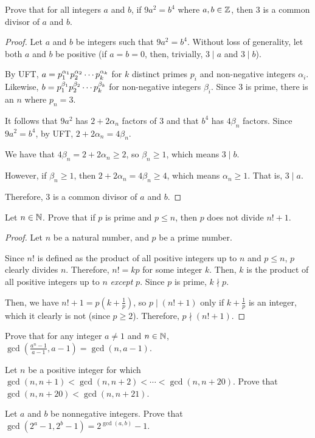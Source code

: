 \documentclass{agony}
\begin{document}
\question Prove that for all integers $a$ and $b$,
if $9a^2 = b^4$ where $a,b\in\mathbb{Z}$, then 3 is a common divisor of $a$ and $b$.
\begin{proof}
  Let $a$ and $b$ be integers such that $9a^2=b^4$.
  Without loss of generality, let both $a$ and $b$ be positive
  (if $a=b=0$, then, trivially, $3 \mid a$ and $3 \mid b$).

  By UFT, $a=\pf{\alpha_#1}{k}$ for $k$ distinct primes $p_i$ and non-negative integers $\alpha_i$.
  Likewise, $b=\pf{\beta_#1}{k}$ for non-negative integers $\beta_i$.
  Since 3 is prime, there is an $n$ where $p_n=3$.

  It follows that $9a^2$ has $2+2\alpha_n$ factors of 3 and that $b^4$ has $4\beta_n$ factors.
  Since $9a^2=b^4$, by UFT, $2+2\alpha_n=4\beta_n$.

  We have that $4\beta_n = 2+2\alpha_n \geq 2$, so $\beta_n \geq 1$, which means $3 \mid b$.

  However, if $\beta_n \geq 1$, then $2+2\alpha_n = 4\beta_n \geq 4$, which means $\alpha_n \geq 1$.
  That is, $3 \mid a$.

  Therefore, 3 is a common divisor of $a$ and $b$.
\end{proof}


\question Let $n\in\mathbb{N}$. Prove that if $p$ is prime and $p \leq n$, then $p$ does not divide $n! + 1$.
\begin{proof}
  Let $n$ be a natural number, and $p$ be a prime number.

  Since $n!$ is defined as the product of all positive integers up to $n$ and $p \leq n$, $p$ clearly divides $n$.
  Therefore, $n! = kp$ for some integer $k$.
  Then, $k$ is the product of all positive integers up to $n$ \emph{except} $p$.
  Since $p$ is prime, $k \nmid p$.

  Then, we have $n!+1 = p(k+\frac{1}{p})$, so $p \mid (n!+1)$ only if $k+\frac{1}{p}$ is an integer,
  which it clearly is not (since $p \geq 2$).
  Therefore, $p \nmid (n!+1)$.
\end{proof}



\question Prove that for any integer $a \neq 1$ and $n\in\mathbb{N}$,
$\gcd\left( \frac{a^n-1}{a-1}, a-1 \right) = \gcd(n, a-1)$.

\question Let $n$ be a positive integer for which
$\gcd(n, n + 1) < \gcd(n, n + 2) < \cdots < {\gcd(n, n + 20)}$.
Prove that $\gcd(n, n + 20) < \gcd(n, n + 21)$.

\question Let $a$ and $b$ be nonnegative integers.
Prove that $\gcd(2^a - 1, 2^b - 1) = 2^{\gcd(a,b)} - 1$.
\end{document}
